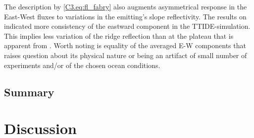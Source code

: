 \documentclass[12pt]{article}
\begin{document}
The description by \eqref{C3.eq:fl_fabry} also augments asymmetrical response in the 
East-West fluxes to variations in the emitting's slope reflectivity. The results on 
 indicated more 
consistency of the eastward component in the TTIDE-simulation. This implies less variation of the 
ridge reflection than at the plateau that is apparent from . Worth noting 
is equality of the averaged E-W components that raises question about its physical nature or 
being an artifact of small number of experiments and/or of the chosen ocean conditions.\\

\subsection{Summary}

\newpage
\section{Discussion}
\label{C3.sec:disc}


%

\end{document}
